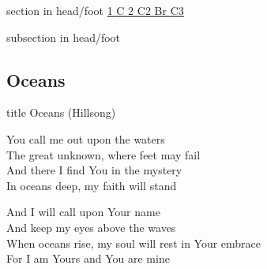 \documentclass[aspectratio=169]{beamer}
\begin{document}
{
{ 
 {
 \begin{beamercolorbox}[ht=4.5ex,dp=1.5ex,%
      leftskip=.3cm,rightskip=.3cm plus1fil]{section in head/foot}
 \fontsize{12}{25}\selectfont 
\hyperlink{Oceans[](Hillsong)1}{1  }\hyperlink{Oceans[](Hillsong)C}{C  }\hyperlink{Oceans[](Hillsong)2}{2  }\hyperlink{Oceans[](Hillsong)C2}{C2  }\hyperlink{Oceans[](Hillsong)Br}{Br  }\hyperlink{Oceans[](Hillsong)C3}{C3  } 
 \end{beamercolorbox}%
  \begin{beamercolorbox}[ht=2.5ex,dp=1.125ex,%
   leftskip=.3cm,rightskip=.3cm plus1fil]{subsection in head/foot}
   \insertauthor
 \end{beamercolorbox}%
 }
}
\subsection{Oceans}
\hypertarget{Oceans[](Hillsong)}{}
\begin{frame}{}
 \vfill
  \centering
  \begin{beamercolorbox}[sep=8pt,center,shadow=true,rounded=true]{title}
    Oceans (Hillsong)    
  \end{beamercolorbox}
  \vfill
\end{frame}

\hypertarget{Oceans[](Hillsong)1}{}
\begin{frame}{}
\fontsize{14.0625}{16.875}\selectfont

You call me out upon the waters\\ 
The great unknown, where feet may fail\\ 
And there I find You in the mystery\\ 
In oceans deep, my faith will stand

\end{frame}
\hypertarget{Oceans[](Hillsong)C}{}
\begin{frame}{}
\fontsize{14.0625}{16.875}\selectfont

And I will call upon Your name\\ 
And keep my eyes above the waves\\ 
When oceans rise, my soul will rest in Your embrace\\ 
For I am Yours and You are mine

\end{frame}
\hypertarget{Oceans[](Hillsong)2}{}
\begin{frame}{}
\fontsize{14.0625}{16.875}\selectfont


\end{frame}}
\end{document}
